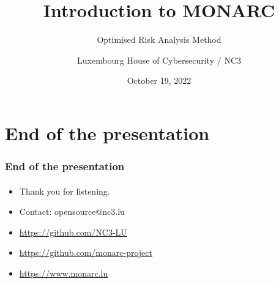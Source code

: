 \documentclass[]{beamer}
\title[Introduction to MONARC]{Introduction to MONARC}
\subtitle{Optimised Risk Analysis Method}
\author[NC3]{Luxembourg House of Cybersecurity / NC3}
\institute[]{\href{https://opensource.nc3.lu}{National Cybersecurity Competence Center of Luxembourg}}
\date{October 19, 2022}
\begin{document}
\begin{frame}
  \titlepage
\end{frame}





% 
% 



%
%
\section*{End of the presentation}
\begin{frame}
  \frametitle{End of the presentation}
  \framesubtitle{}
  \begin{center}
    \begin{itemize}
      \item Thank you for listening.
      \item Contact: opensource@nc3.lu
      \item \url{https://github.com/NC3-LU}
      \item \url{https://github.com/monarc-project}
      \item \url{https://www.monarc.lu}
    \end{itemize}
  \end{center}
\end{frame}
\end{document}
